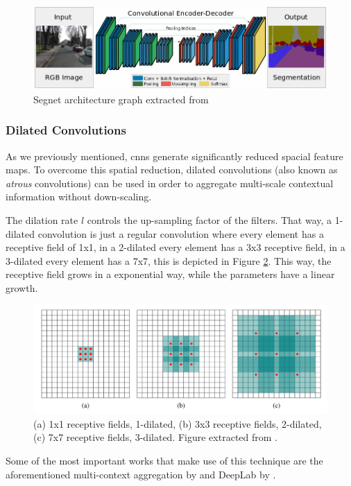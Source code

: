 \begin{figure}[h]
	\includegraphics[scale=0.5]{archivos/segnet.png}
	\centering
	\caption{Segnet architecture graph extracted from \cite{DBLP:journals/corr/BadrinarayananK15}}
	\label{fig:segnet}
\end{figure}

\subsubsection{Dilated Convolutions}
As we previously mentioned, \gls{cnn}s generate significantly reduced spacial feature maps. To overcome this spatial reduction, dilated convolutions (also known as \textit{atrous} convolutions) can be used in order to aggregate multi-scale contextual information without down-scaling.

The dilation rate $l$ controls the up-sampling factor of the filters. That way, a 1-dilated convolution is just a regular convolution where every element has a receptive field of 1x1, in a 2-dilated every element has a 3x3 receptive field, in a 3-dilated every element has a 7x7, this is depicted in Figure \ref{fig:dilatedconv}. This way, the receptive field grows in a exponential way, while the parameters have a linear growth.

\begin{figure}
	\centering
	\includegraphics[width=0.7\linewidth]{archivos/dilated_conv}
	\caption{(a) 1x1 receptive fields, 1-dilated, (b) 3x3 receptive fields, 2-dilated, (c) 7x7 receptive fields, 3-dilated. Figure extracted from \cite{yu2015multiscale}.}
	\label{fig:dilatedconv}
\end{figure}

Some of the most important works that make use of this technique are the aforementioned multi-context aggregation by \cite{yu2015multiscale} and DeepLab by \cite{DBLP:journals/corr/ChenPK0Y16}.

